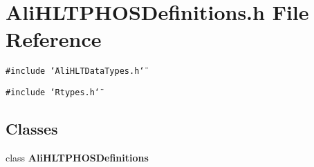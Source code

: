 \section{Ali\-HLTPHOSDefinitions.h File Reference}
\label{AliHLTPHOSDefinitions_8h}


{\tt \#include \char`\"{}Ali\-HLTData\-Types.h\char`\"{}}\par
{\tt \#include \char`\"{}Rtypes.h\char`\"{}}\par
\subsection*{Classes}
\begin{CompactItemize}
\item 
class {\bf Ali\-HLTPHOSDefinitions}
\end{CompactItemize}
